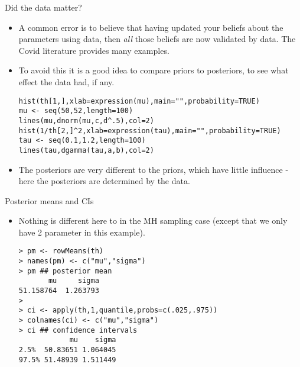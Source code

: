 \documentclass{beamer}
\newcommand{\eps}[3]
{{\begin{center}
 \rotatebox{#1}{\scalebox{#2}{\texttt{[image: \#3]}}}
 \end{center}}
}
\begin{document}
\begin{frame}[fragile]{Did the data matter?}
\begin{itemize}
\item A common error is to believe that having updated your beliefs about the parameters using data, then {\em all} those beliefs are now validated by data. The Covid literature provides many examples.
\item To avoid this it is a good idea to compare priors to posteriors, to see what effect the data had, if any. {\scriptsize \begin{verbatim}
hist(th[1,],xlab=expression(mu),main="",probability=TRUE)
mu <- seq(50,52,length=100)
lines(mu,dnorm(mu,c,d^.5),col=2)
hist(1/th[2,]^2,xlab=expression(tau),main="",probability=TRUE)
tau <- seq(0.1,1.2,length=100) 
lines(tau,dgamma(tau,a,b),col=2)
\end{verbatim}}
\vspace*{-1cm}
\eps{-90}{.4}{nh-popr.eps}
\item The posteriors are very different to the priors, which have little influence - here the posteriors are determined by the data. 
\end{itemize}
\end{frame}

\begin{frame}[fragile]{Posterior means and CIs}
\begin{itemize}
\item Nothing is different here to in the MH sampling case (except that we only have 2 parameter in this example).
{\scriptsize \begin{verbatim}
> pm <- rowMeans(th)
> names(pm) <- c("mu","sigma")
> pm ## posterior mean
       mu     sigma 
51.158764  1.263793 
> 
> ci <- apply(th,1,quantile,probs=c(.025,.975))
> colnames(ci) <- c("mu","sigma")
> ci ## confidence intervals
            mu    sigma
2.5%  50.83651 1.064045
97.5% 51.48939 1.511449
\end{verbatim}}
\end{itemize}
\end{frame}
\end{document}
